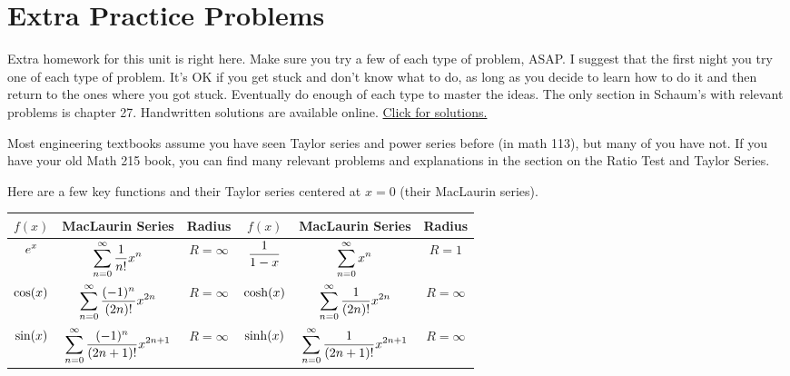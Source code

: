 



\section{Extra Practice Problems}

Extra homework for this unit is right here.
Make sure you try a few of each type of problem, ASAP. I suggest that the first night you try one of each type of problem. It's OK if you get stuck and don't know what to do, as long as you decide to learn how to do it and then return to the ones where you got stuck. Eventually do enough of each type to master the ideas.  The only section in Schaum's with relevant problems is chapter 27.  Handwritten solutions are available online.  \href{https://content.byui.edu/file/664390b8-e9cc-43a4-9f3c-70362f8b9735/1/08-Power-Series-Preparation-Solutions.pdf}{Click for solutions.}

Most engineering textbooks assume you have seen Taylor series and power series before (in math 113), but many of you have not. If you have your old Math 215 book, you can find many relevant problems and explanations in the section on the Ratio Test and Taylor Series.  

Here are a few key functions and their Taylor series centered at $x=0$ (their MacLaurin series).
\begin{center}
\begin{tabular}{|c|c|c||c|c|c|}\hline
$f(x)$ & MacLaurin Series & Radius&$f(x)$ & MacLaurin Series & Radius\\\hline
$\displaystyle e^x$ & $ \displaystyle\sum_{n=0}^\infty \frac{1}{n!}x^n$& $R=\infty$&
$\displaystyle \frac{1}{1-x} $&$   \displaystyle\sum_{n=0}^\infty x^n$& $R=1$\\\hline
$\displaystyle \cos(x) $&$  \displaystyle \sum_{n=0}^\infty \frac{(-1)^n}{(2n)!}x^{2n}$& $R=\infty$&
$\displaystyle \cosh(x) $&$   \displaystyle\sum_{n=0}^\infty \frac{1}{(2n)!}x^{2n}$& $R=\infty$\\\hline
$\displaystyle \sin(x) $&$   \displaystyle\sum_{n=0}^\infty \frac{(-1)^n}{(2n+1)!}x^{2n+1}$& $R=\infty$&
$\displaystyle \sinh(x)$&$  \displaystyle\sum_{n=0}^\infty \frac{1}{(2n+1)!}x^{2n+1}$& $R=\infty$\\\hline
\end{tabular} 
\end{center}




